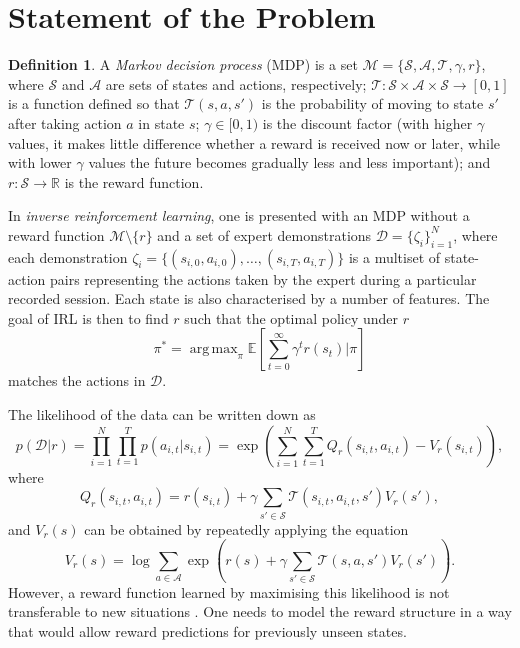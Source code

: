 \documentclass{mprop}
\theoremstyle{definition}
\newtheorem{definition}{Definition}
\DeclareMathOperator*{\argmax}{arg\,max}
\begin{document}
\section{Statement of the Problem}

\begin{definition}
  A \emph{Markov decision process} (MDP) is a set $\mathcal{M} = \{ \mathcal{S},
  \mathcal{A}, \mathcal{T}, \gamma, r \}$, where $\mathcal{S}$ and
  $\mathcal{A}$ are sets of states and actions, respectively; $\mathcal{T} :
  \mathcal{S} \times \mathcal{A} \times \mathcal{S} \to [0, 1]$ is a function
  defined so that $\mathcal{T}(s, a, s')$ is the probability of moving to state $s'$
  after taking action $a$ in state $s$; $\gamma \in [0, 1)$ is the discount
  factor (with higher $\gamma$ values, it makes little difference whether a
  reward is received now or later, while with lower $\gamma$ values the future
  becomes gradually less and less important); and $r : \mathcal{S} \to
  \mathbb{R}$ is the reward function.
\end{definition}

In \emph{inverse reinforcement learning}, one is presented with an MDP without a
reward function $\mathcal{M} \setminus \{ r \}$ and a set of expert
demonstrations $\mathcal{D} = \{ \zeta_i \}_{i=1}^N$, where each demonstration
$\zeta_i = \{ (s_{i,0}, a_{i,0}), \dots, (s_{i,T}, a_{i,T}) \}$ is a multiset of
state-action pairs representing the actions taken by the expert during a
particular recorded session. Each state is also characterised by a number of
features. The goal of IRL is then to find $r$ such that the optimal policy under
$r$
\[ \pi^* = \argmax_\pi \mathbb{E}\left[ \sum_{t=0}^\infty \gamma^t r(s_t) | \pi
  \right] \]
matches the actions in $\mathcal{D}$.

The likelihood of the data can be written down as
\cite{DBLP:conf/uai/JinDAS17,DBLP:conf/nips/LevinePK11}
\begin{equation} \label{pDr}
  p(\mathcal{D} | r) = \prod_{i=1}^N \prod_{t=1}^T p(a_{i,t} | s_{i,t}) = \exp\left( \sum_{i=1}^N \sum_{t=1}^T Q_r(s_{i,t}, a_{i,t}) - V_r(s_{i,t}) \right),
\end{equation}
where
\begin{equation}
  Q_r(s_{i,t}, a_{i,t}) = r(s_{i,t}) + \gamma\sum_{s' \in \mathcal{S}}
  \mathcal{T}(s_{i,t}, a_{i,t}, s')V_r(s'),
\end{equation}
and $V_r(s)$ can be obtained by repeatedly applying the equation
\cite{supplementary_material}
\[ V_r(s) = \log \sum_{a \in \mathcal{A}} \exp\left( r(s) + \gamma\sum_{s' \in
      \mathcal{S}} \mathcal{T}(s, a, s')V_r(s') \right). \]
However, a reward function learned by maximising this likelihood is not
transferable to new situations
\cite{DBLP:conf/uai/JinDAS17,DBLP:conf/nips/LevinePK11}. One needs to model the
reward structure in a way that would allow reward predictions for previously
unseen states.
\end{document}
